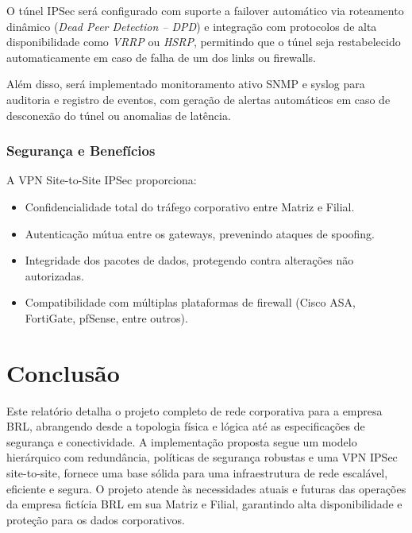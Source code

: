 \documentclass[a4paper, 12pt]{article}
\begin{document}
O túnel IPSec será configurado com suporte a failover automático via roteamento dinâmico (\textit{Dead Peer Detection – DPD}) e integração com protocolos de alta disponibilidade como \textit{VRRP} ou \textit{HSRP}, permitindo que o túnel seja restabelecido automaticamente em caso de falha de um dos links ou firewalls.

Além disso, será implementado monitoramento ativo SNMP e syslog para auditoria e registro de eventos, com geração de alertas automáticos em caso de desconexão do túnel ou anomalias de latência.

\subsubsection{Segurança e Benefícios}
\label{subsubsec:vpn-security}

A VPN Site-to-Site IPSec proporciona:
\begin{itemize}
    \item Confidencialidade total do tráfego corporativo entre Matriz e Filial.
    \item Autenticação mútua entre os gateways, prevenindo ataques de spoofing.
    \item Integridade dos pacotes de dados, protegendo contra alterações não autorizadas.
    \item Compatibilidade com múltiplas plataformas de firewall (Cisco ASA, FortiGate, pfSense, entre outros).
\end{itemize}

\section{Conclusão}
\label{sec:conclusao}

Este relatório detalha o projeto completo de rede corporativa para a empresa BRL, abrangendo desde a topologia física e lógica até as especificações de segurança e conectividade. A implementação proposta segue um modelo hierárquico com redundância, políticas de segurança robustas e uma VPN IPSec site-to-site, fornece uma base sólida para uma infraestrutura de rede escalável, eficiente e segura. O projeto atende às necessidades atuais e futuras das operações da empresa fictícia BRL em sua Matriz e Filial, garantindo alta disponibilidade e proteção para os dados corporativos.
\end{document}
